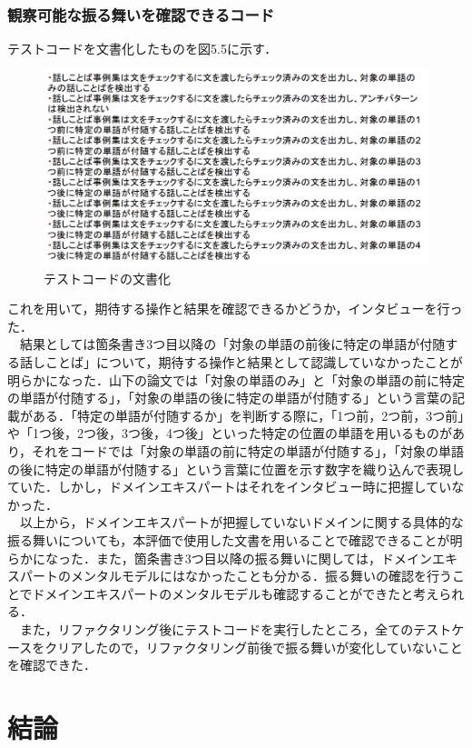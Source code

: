 \documentclass[12pt, a4paper]{jreport}
\begin{document}
\subsection{観察可能な振る舞いを確認できるコード}
テストコードを文書化したものを図5.5に示す．
\begin{figure}[H]
\centering
\includegraphics[width=1\linewidth]{image/hurumai.png}
\caption{テストコードの文書化}
\label{fig:enter-label}
\end{figure}
これを用いて，期待する操作と結果を確認できるかどうか，インタビューを行った．
\\　結果としては箇条書き3つ目以降の「対象の単語の前後に特定の単語が付随する話しことば」について，期待する操作と結果として認識していなかったことが明らかになった．山下の論文では「対象の単語のみ」と「対象の単語の前に特定の単語が付随する」，「対象の単語の後に特定の単語が付随する」という言葉の記載がある．「特定の単語が付随するか」を判断する際に，「1つ前，2つ前，3つ前」や「1つ後，2つ後，3つ後，4つ後」といった特定の位置の単語を用いるものがあり，それをコードでは「対象の単語の前に特定の単語が付随する」，「対象の単語の後に特定の単語が付随する」という言葉に位置を示す数字を織り込んで表現していた．しかし，ドメインエキスパートはそれをインタビュー時に把握していなかった．
\\　以上から，ドメインエキスパートが把握していないドメインに関する具体的な振る舞いについても，本評価で使用した文書を用いることで確認できることが明らかになった．また，箇条書き3つ目以降の振る舞いに関しては，ドメインエキスパートのメンタルモデルにはなかったことも分かる．振る舞いの確認を行うことでドメインエキスパートのメンタルモデルも確認することができたと考えられる．
\\　また，リファクタリング後にテストコードを実行したところ，全てのテストケースをクリアしたので，リファクタリング前後で振る舞いが変化していないことを確認できた．
\chapter{結論}
\end{document}
